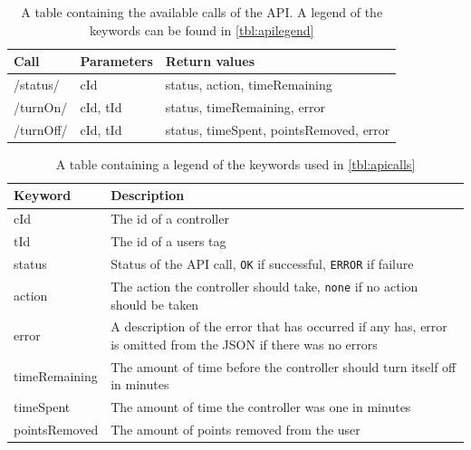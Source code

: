 \begin{table}[!h]
\begin{tabular}{| l | l | l |}
\hline
Call & Parameters & Return values \\
\hline
/status/ & cId & status, action, timeRemaining \\
\hline
/turnOn/ & cId, tId & status, timeRemaining, error \\
\hline
/turnOff/ & cId, tId & status, timeSpent, pointsRemoved, error \\
\hline
\end{tabular}
\caption{A table containing the available calls of the API. A legend of the keywords can be found in \autoref{tbl:apilegend}}
\label{tbl:apicalls}
\end{table}

\begin{table}[!h]
\begin{tabular}{| l | p{9cm} |}
\hline
Keyword & Description \\
\hline
cId & The id of a controller \\
\hline
tId & The id of a users tag \\
\hline
status & Status of the API call, \texttt{OK} if successful, \texttt{ERROR} if failure \\
\hline
action & The action the controller should take, \texttt{none} if no action should be taken \\
\hline
error & A description of the error that has occurred if any has, error is omitted from the JSON if there was no errors \\
\hline
timeRemaining & The amount of time before the controller should turn itself off in minutes \\
\hline
timeSpent & The amount of time the controller was one in minutes \\
\hline
pointsRemoved & The amount of points removed from the user \\
\hline
\end{tabular}
\caption{A table containing a legend of the keywords used in \autoref{tbl:apicalls}}
\label{tbl:apilegend}
\end{table}

